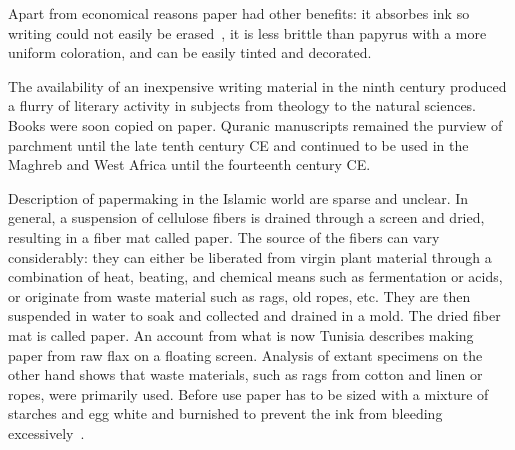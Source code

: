 Apart from economical reasons paper had other benefits: it absorbes ink so
writing could not easily be erased~\cite[pg. 45]{blair2006islamic}, it is less
brittle than papyrus with a more uniform coloration, and can be easily tinted
and decorated.

The availability of an inexpensive writing material in the ninth century
produced a flurry of literary activity in subjects from theology to the natural
sciences. Books were soon copied on paper. Quranic manuscripts remained the
purview of parchment until the late tenth century CE and continued to be used
in the Maghreb and West Africa until the fourteenth century CE.

Description of papermaking in the Islamic world are sparse and unclear. In
general, a suspension of cellulose fibers is drained through a screen and
dried, resulting in a fiber mat called paper. The source of the fibers can vary
considerably: they can either be liberated from virgin plant material through a
combination of heat, beating, and chemical means such as fermentation or acids,
or originate from waste material such as rags, old ropes, etc. They are then
suspended in water to soak and collected and drained in a mold. The dried fiber
mat is called paper. An account from what is now Tunisia describes making paper
from raw flax on a floating screen. Analysis of extant specimens on the other
hand shows that waste materials, such as rags from cotton and linen or ropes,
were primarily used. Before use paper has to be sized with a mixture of
starches and egg white and burnished to prevent the ink from bleeding
excessively~\cite[pg. 44-45]{bloompaper}.

